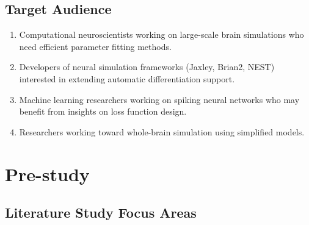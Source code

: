 \documentclass{article}
\begin{document}
\subsection{Target Audience}

\begin{enumerate}
    \item Computational neuroscientists working on large-scale brain simulations who need efficient parameter fitting methods.
    \item Developers of neural simulation frameworks (Jaxley, Brian2, NEST) interested in extending automatic differentiation support.
    \item Machine learning researchers working on spiking neural networks who may benefit from insights on loss function design.
    \item Researchers working toward whole-brain simulation using simplified models.
\end{enumerate}

\section{Pre-study}

\subsection{Literature Study Focus Areas}
\end{document}
